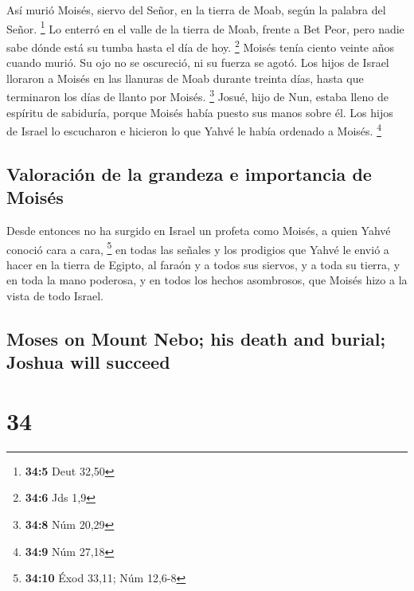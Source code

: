 \begin{paracol}{2}
 Así murió Moisés, siervo del Señor, en la tierra de Moab,
según la palabra del Señor. \footnote{\textbf{34:5} Deut 32,50}
 Lo enterró en el valle de la tierra de Moab, frente a Bet
Peor, pero nadie sabe dónde está su tumba hasta el día de hoy.
\footnote{\textbf{34:6} Jds 1,9}  Moisés tenía ciento
veinte años cuando murió. Su ojo no se oscureció, ni su fuerza se agotó.
 Los hijos de Israel lloraron a Moisés en las llanuras de
Moab durante treinta días, hasta que terminaron los días de llanto por
Moisés. \footnote{\textbf{34:8} Núm 20,29}  Josué, hijo de
Nun, estaba lleno de espíritu de sabiduría, porque Moisés había puesto
sus manos sobre él. Los hijos de Israel lo escucharon e hicieron lo que
Yahvé le había ordenado a Moisés. \footnote{\textbf{34:9} Núm 27,18}

\hypertarget{valoraciuxf3n-de-la-grandeza-e-importancia-de-moisuxe9s}{%
\subsection{Valoración de la grandeza e importancia de
Moisés}\label{valoraciuxf3n-de-la-grandeza-e-importancia-de-moisuxe9s}}

 Desde entonces no ha surgido en Israel un profeta como
Moisés, a quien Yahvé conoció cara a cara, \footnote{\textbf{34:10} Éxod
  33,11; Núm 12,6-8}  en todas las señales y los
prodigios que Yahvé le envió a hacer en la tierra de Egipto, al faraón y
a todos sus siervos, y a toda su tierra,  y en toda la
mano poderosa, y en todos los hechos asombrosos, que Moisés hizo a la
vista de todo Israel. \switchcolumn
\begin{otherlanguage}{english}

\hypertarget{moses-on-mount-nebo-his-death-and-burial-joshua-will-succeed}{%
\subsection{Moses on Mount Nebo; his death and burial; Joshua will
succeed}\label{moses-on-mount-nebo-his-death-and-burial-joshua-will-succeed}}

\hypertarget{section-67}{%
\section{34}\label{section-67}}


\end{otherlanguage}
\end{paracol}
